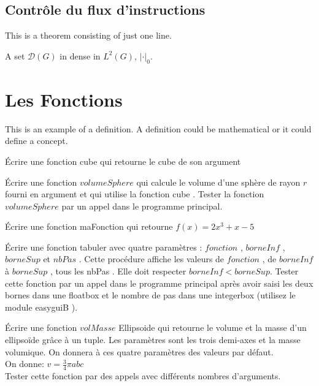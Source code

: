 \subsection{Contrôle du flux d’instructions}
This is a theorem consisting of just one line.

\begin{exercise}
A set $\mathcal{D}(G)$ in dense in $L^2(G)$, $|\cdot|_0$. 
\end{exercise}
\begin{solution}
\end{solution}

\section{Les Fonctions}

This is an example of a definition. A definition could be mathematical or it could define a concept.

\begin{exercise}
Écrire une fonction cube qui retourne le cube de son argument
\end{exercise}

\begin{exercise}
Écrire une fonction $volumeSphere$ qui calcule le volume d’une sphère de rayon $r$ fourni
en argument et qui utilise la fonction cube .
Tester la fonction $volumeSphere$ par un appel dans le programme principal.
\end{exercise}

\begin{exercise}
Écrire une fonction maFonction qui retourne $f(x) = 2x^{3} + x - 5$
\end{exercise}

\begin{exercise}
Écrire une fonction tabuler avec quatre paramètres : $fonction$ , $borneInf$ , $borneSup$
et $nbPas$ . Cette procédure affiche les valeurs de $fonction$ , de $borneInf$ à $borneSup$ ,
tous les nbPas . Elle doit respecter $borneInf < borneSup$.
Tester cette fonction par un appel dans le programme principal après avoir saisi les
deux bornes dans une floatbox et le nombre de pas dans une integerbox (utilisez le
module easyguiB ).
\end{exercise}

\begin{exercise}
Écrire une fonction $volMasse$ Ellipsoide qui retourne le volume et la masse d’un ellipsoïde grâce à un tuple. Les paramètres sont les trois demi-axes et la masse volumique. On donnera à ces quatre paramètres des valeurs par défaut. \\
On donne: $v = \frac{3}{4} \pi abc$ \\
Tester cette fonction par des appels avec différents nombres d’arguments.
\end{exercise}

